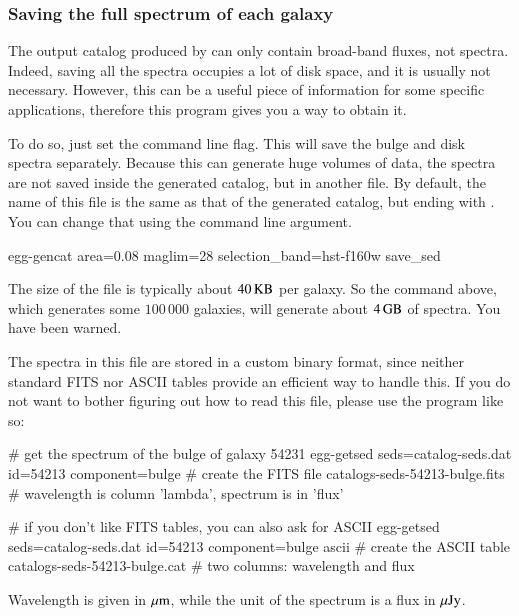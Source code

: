 \subsubsection{Saving the full spectrum of each galaxy}

The output catalog produced by  can only contain broad-band fluxes, not spectra. Indeed, saving all the spectra occupies a lot of disk space, and it is usually not necessary. However, this can be a useful piece of information for some specific applications, therefore this program gives you a way to obtain it.

To do so, just set the  command line flag. This will save the bulge and disk spectra separately. Because this can generate huge volumes of data, the spectra are not saved inside the generated catalog, but in another file. By default, the name of this file is the same as that of the generated catalog, but ending with . You can change that using the  command line argument.
\begin{bashcode}
egg-gencat area=0.08 maglim=28 selection_band=hst-f160w save_sed
\end{bashcode}
The size of the file is typically about $40\,{\rm KB}$ per galaxy. So the command above, which generates some $100\,000$ galaxies, will generate about $4\,{\rm GB}$ of spectra. You have been warned.

The spectra in this file are stored in a custom binary format, since neither standard FITS nor ASCII tables provide an efficient way to handle this. If you do not want to bother figuring out how to read this file, please use the  program like so:
\begin{bashcode}
# get the spectrum of the bulge of galaxy 54231
egg-getsed seds=catalog-seds.dat id=54213 component=bulge
# create the FITS file catalogs-seds-54213-bulge.fits
# wavelength is column 'lambda', spectrum is in 'flux'

# if you don't like FITS tables, you can also ask for ASCII
egg-getsed seds=catalog-seds.dat id=54213 component=bulge ascii
# create the ASCII table catalogs-seds-54213-bulge.cat
# two columns: wavelength and flux
\end{bashcode}
Wavelength is given in $\mu{\rm m}$, while the unit of the spectrum is a flux in $\mu{\rm Jy}$.

